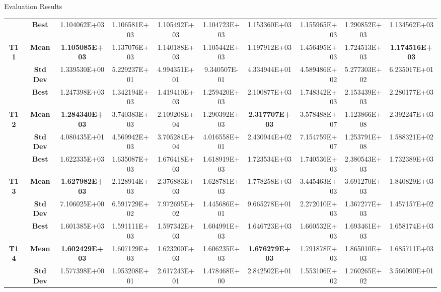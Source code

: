 \documentclass[table]{beamer}
\begin{document}
\begin{frame}{Evaluation Results}
\begin{table}[htbp]
{\begin{tabular}{|c|c|c|c|c|c|c|r|c|c|}
				\multicolumn{ 1}{|c|}{} & \textbf{Best} & 1.104062E+03 & 1.106581E+03 & 1.105492E+03 & 1.104723E+03 & 1.153360E+03 & 1.155965E+03 & 1.290852E+03 & 1.134562E+03 \\ \cline{ 2- 10}
				\multicolumn{ 1}{|c|}{\textbf{T11}} & \textbf{Mean} & \textbf{1.105085E+03} & 1.137076E+03 & 1.140188E+03 & 1.105442E+03 & 1.197912E+03 & 1.456495E+03 & 1.724513E+03 & \textbf{1.174516E+03} \\ \cline{ 2- 10}
				\multicolumn{ 1}{|c|}{} & \textbf{Std Dev} & 1.339530E+00 & 5.229237E+01 & 4.994351E+01 & 9.340507E-01 & 4.334944E+01 & 4.589486E+02 & 5.277303E+02 & 6.235017E+01 \\ \hline
				\multicolumn{ 1}{|c|}{} & \textbf{Best} & 1.247398E+03 & 1.342194E+03 & 1.419410E+03 & 1.259420E+03 & 2.100877E+03 & 1.748342E+03 & 2.153439E+03 & 2.280177E+03 \\ \cline{ 2- 10}
				\multicolumn{ 1}{|c|}{\textbf{T12}} & \textbf{Mean} & \textbf{1.284340E+03} & 3.740383E+03 & 2.109208E+04 & 1.290392E+03 & \textbf{2.317707E+03} & 3.578488E+07 & 1.123866E+08 & 2.392247E+03 \\ \cline{ 2- 10}
				\multicolumn{ 1}{|c|}{} & \textbf{Std Dev} & 4.080435E+01 & 4.569942E+03 & 3.705284E+04 & 4.016558E+01 & 2.430944E+02 & 7.154759E+07 & 1.253791E+08 & 1.588321E+02 \\ \hline
				\multicolumn{ 1}{|c|}{} & \textbf{Best} & 1.622335E+03 & 1.635087E+03 & 1.676418E+03 & 1.618919E+03 & 1.723534E+03 & 1.740536E+03 & 2.380543E+03 & 1.732389E+03 \\ \cline{ 2- 10}
				\multicolumn{ 1}{|c|}{\textbf{T13}} & \textbf{Mean} & \textbf{1.627982E+03} & 2.128914E+03 & 2.376883E+03 & 1.628781E+03 & 1.778258E+03 & 3.445463E+03 & 3.691270E+03 & 1.840829E+03 \\ \cline{ 2- 10}
				\multicolumn{ 1}{|c|}{} & \textbf{Std Dev} & 7.106025E+00 & 6.591729E+02 & 7.972695E+02 & 1.445686E+01 & 9.665278E+01 & 2.272010E+03 & 1.367277E+03 & 1.457157E+02 \\ \hline
				\multicolumn{ 1}{|c|}{} & \textbf{Best} & 1.601385E+03 & 1.591111E+03 & 1.597342E+03 & 1.604991E+03 & 1.646723E+03 & 1.660532E+03 & 1.693461E+03 & 1.658174E+03 \\ \cline{ 2- 10}
				\multicolumn{ 1}{|c|}{\textbf{T14}} & \textbf{Mean} & \textbf{1.602429E+03} & 1.607129E+03 & 1.623200E+03 & 1.606235E+03 & \textbf{1.676279E+03} & 1.791878E+03 & 1.865010E+03 & 1.685711E+03 \\ \cline{ 2- 10}
				\multicolumn{ 1}{|c|}{} & \textbf{Std Dev} & 1.577398E+00 & 1.953208E+01 & 2.617243E+01 & 1.478468E+00 & 2.842502E+01 & 1.553106E+02 & 1.760265E+02 & 3.566090E+01 \\ \hline

\end{tabular}}
\end{table}
\end{frame}
\end{document}
